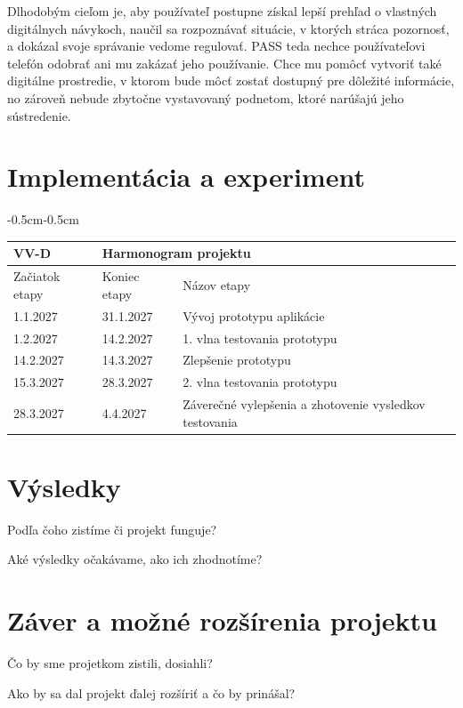 \documentclass[11pt,a4paper,slovak]{article}
\begin{document}
Dlhodobým cieľom je, aby používateľ postupne získal lepší prehľad o vlastných digitálnych návykoch, naučil sa rozpoznávať situácie, v ktorých stráca pozornosť, a dokázal svoje správanie vedome regulovať. PASS teda nechce používateľovi telefón odobrať ani mu zakázať jeho používanie. Chce mu pomôcť vytvoriť také digitálne prostredie, v ktorom bude môcť zostať dostupný pre dôležité informácie, no zároveň nebude zbytočne vystavovaný podnetom, ktoré narúšajú jeho sústredenie.

\section{Implementácia a experiment}


\begin{table}[H]
\centering
\begin{adjustwidth}{-0.5cm}{-0.5cm}
\begin{tabularx}{\linewidth}{|l|l|X|}
\hline
\multicolumn{1}{|e|}{VV-D} & \multicolumn{2}{|f|}{Harmonogram projektu} \\ \hline
\multicolumn{1}{|e|}{Začiatok etapy} & \multicolumn{1}{|e|}{Koniec etapy} & \multicolumn{1}{|e|}{Názov etapy}\\ \hline
1.1.2027  & 31.1.2027 & Vývoj prototypu aplikácie \\ \hline
1.2.2027 & 14.2.2027 & 1. vlna testovania prototypu \\ \hline
14.2.2027 & 14.3.2027 & Zlepšenie prototypu \\ \hline
15.3.2027 & 28.3.2027 & 2. vlna testovania prototypu \\ \hline
28.3.2027 & 4.4.2027 & Záverečné vylepšenia a zhotovenie vysledkov testovania \\ \hline

\end{tabularx}
\end{adjustwidth}
\end{table}


\section{Výsledky}

Podľa čoho zistíme či projekt funguje?

Aké výsledky očakávame, ako ich zhodnotíme?

\section{Záver a možné rozšírenia projektu}

Čo by sme projetkom zistili, dosiahli?

Ako by sa dal projekt ďalej rozšíriť a čo by prinášal?



\end{document}
